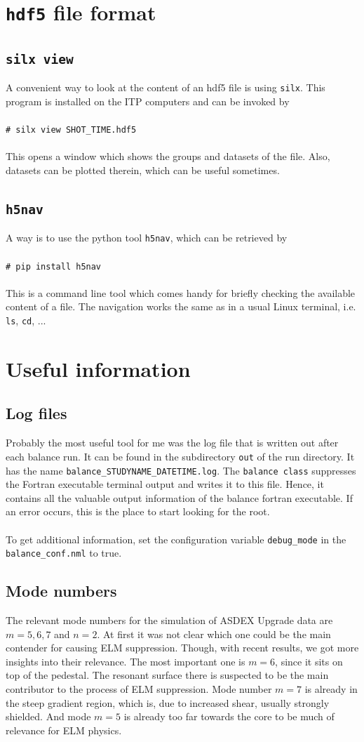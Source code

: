 \documentclass[11pt]{article}
\newcommand{\shellcmd}[1]{\\\\\indent\indent\texttt{\footnotesize\# #1}\\\\}
\begin{document}
\pagebreak
\appendix
\appendixpage
\addappheadtotoc


\section{\texttt{hdf5} file format}
\label{sec:hdf5}
\subsection{\texttt{silx view}}
A convenient way to look at the content of an hdf5 file is using \texttt{silx}. This program is installed on the ITP computers and can be invoked by \shellcmd{silx view SHOT\_TIME.hdf5}
This opens a window which shows the groups and datasets of the file. Also, datasets can be plotted therein, which can be useful sometimes.
\subsection{\texttt{h5nav}}
A way is to use the python tool \texttt{h5nav}, which can be retrieved by \shellcmd{pip install h5nav}
This is a command line tool which comes handy for briefly checking the available content of a file. The navigation works the same as in a usual Linux terminal, i.e. \texttt{ls}, \texttt{cd}, ...

\section{Useful information}

\subsection{Log files}
Probably the most useful tool for me was the log file that is written out after each balance run. It can be found in the subdirectory \texttt{out} of the run directory. It has the name \texttt{balance\_STUDYNAME\_DATETIME.log}. The \texttt{balance class} suppresses the Fortran executable terminal output and writes it to this file. Hence, it contains all the valuable output information of the balance fortran executable. If an error occurs, this is the place to start looking for the root.\\\\
To get additional information, set the configuration variable \texttt{debug\_mode} in the \texttt{balance\_conf.nml} to true.

\subsection{Mode numbers}
The relevant mode numbers for the simulation of ASDEX Upgrade data are $m=5,6,7$ and $n=2$. At first it was not clear which one could be the main contender for causing ELM suppression. Though, with recent results, we got more insights into their relevance. The most important one is $m=6$, since it sits on top of the pedestal. The resonant surface there is suspected to be the main contributor to the process of ELM suppression. Mode number $m=7$ is already in the steep gradient region, which is, due to increased shear, usually strongly shielded. And mode $m=5$ is already too far towards the core to be much of relevance for ELM physics.
\end{document}
